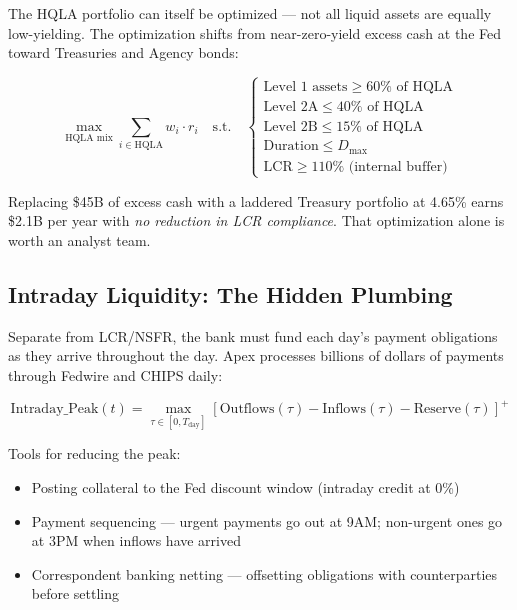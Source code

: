 \documentclass[12pt,a4paper]{article}
\begin{document}
The HQLA portfolio can itself be optimized --- not all liquid assets are
equally low-yielding.  The optimization shifts from near-zero-yield excess
cash at the Fed toward Treasuries and Agency bonds:

\begin{equation}
  \max_{\text{HQLA mix}} \sum_{i \in \text{HQLA}} w_i \cdot r_i
  \quad \text{s.t.} \quad
  \begin{cases}
    \text{Level 1 assets} \geq 60\% \text{ of HQLA} \\
    \text{Level 2A} \leq 40\% \text{ of HQLA} \\
    \text{Level 2B} \leq 15\% \text{ of HQLA} \\
    \text{Duration} \leq D_{\text{max}} \\
    \text{LCR} \geq 110\% \text{ (internal buffer)}
  \end{cases}
\end{equation}

Replacing \$45B of excess cash with a laddered Treasury portfolio at 4.65\%
earns \$2.1B per year with \emph{no reduction in LCR compliance}.  That
optimization alone is worth an analyst team.

\subsection{Intraday Liquidity: The Hidden Plumbing}

Separate from LCR/NSFR, the bank must fund each day's payment obligations
as they arrive throughout the day.  Apex processes billions of dollars of
payments through Fedwire and CHIPS daily:

\begin{equation}
  \text{Intraday\_Peak}(t) = \max_{\tau \in [0, T_{\text{day}}]}
  \left[ \text{Outflows}(\tau) - \text{Inflows}(\tau) - \text{Reserve}(\tau) \right]^+
\end{equation}

Tools for reducing the peak:
\begin{itemize}[noitemsep]
  \item Posting collateral to the Fed discount window (intraday credit at 0\%)
  \item Payment sequencing --- urgent payments go out at 9AM; non-urgent
        ones go at 3PM when inflows have arrived
  \item Correspondent banking netting --- offsetting obligations with
        counterparties before settling
\end{itemize}
\end{document}
